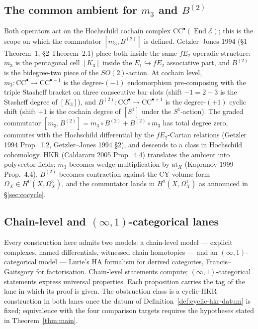 \documentclass[11pt,reqno]{amsart}
\theoremstyle{plain}
\theoremstyle{definition}
\theoremstyle{remark}
\DeclareMathOperator{\End}{End}
\newcommand{\cE}{\mathcal{E}}
\newcommand{\at}{\mathrm{at}}
\begin{document}
\subsection{The common ambient for $m_3$ and $B^{(2)}$}
\label{sub:common-ambient}
Both operators act on the Hochschild cochain complex $\mathrm{CC}^\bullet(\End \cE)$; this is the scope on which the commutator $[m_3, B^{(2)}]$ is defined. Getzler--Jones 1994 (\S1 Theorem~1, \S2 Theorem~2.1) place both inside the same $fE_2$-operadic structure: $m_3$ is the pentagonal cell $[K_3]$ inside the $E_1 \hookrightarrow fE_2$ associative part, and $B^{(2)}$ is the bidegree-two piece of the $SO(2)$-action. At cochain level, $m_3 : \mathrm{CC}^\bullet \to \mathrm{CC}^{\bullet - 1}$ is the degree-$(-1)$ endomorphism pre-composing with the triple Stasheff bracket on three consecutive bar slots (shift $-1 = 2 - 3$ is the Stasheff degree of $[K_3]$), and $B^{(2)} : \mathrm{CC}^\bullet \to \mathrm{CC}^{\bullet + 1}$ is the degree-$(+1)$ cyclic shift (shift $+1$ is the cochain degree of $[S^1]$ under the $S^1$-action). The graded commutator $[m_3, B^{(2)}] = m_3 \circ B^{(2)} + B^{(2)} \circ m_3$ has total degree zero, commutes with the Hochschild differential by the $fE_2$-Cartan relations (Getzler 1994 Prop.~1.2, Getzler--Jones 1994 \S2), and descends to a class in Hochschild cohomology. HKR (Caldararu 2005 Prop.~4.4) translates the ambient into polyvector fields: $m_3$ becomes wedge-multiplication by $\at_X$ (Kapranov 1999 Prop.~4.4), $B^{(2)}$ becomes contraction against the CY volume form $\Omega_X \in H^0(X, \Omega^3_X)$, and the commutator lands in $H^2(X, \Omega^1_X)$ as announced in \S\ref{sec:cocycle}.

\subsection{Chain-level and $(\infty,1)$-categorical lanes}
Every construction here admits two models: a chain-level model --- explicit complexes, named differentials, witnessed chain homotopies --- and an $(\infty,1)$-categorical model --- Lurie's $\mathrm{HA}$ formalism for derived categories, Francis--Gaitsgory for factorisation. Chain-level statements compute; $(\infty,1)$-categorical statements express universal properties. Each proposition carries the tag of the lane in which its proof is given. The obstruction class is a cyclic-HKR construction in both lanes once the datum of Definition~\ref{def:cyclic-hkr-datum} is fixed; equivalence with the four comparison targets requires the hypotheses stated in Theorem~\ref{thm:main}.
\end{document}
